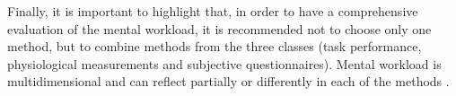         Finally, it is important to highlight that, in order to have a comprehensive evaluation of the mental workload, it is recommended not to choose only one method, but to combine methods from the three classes (task performance, physiological measurements and subjective questionnaires). Mental workload is multidimensional and can reflect partially or differently in each of the methods \cite{sanders1998human}.